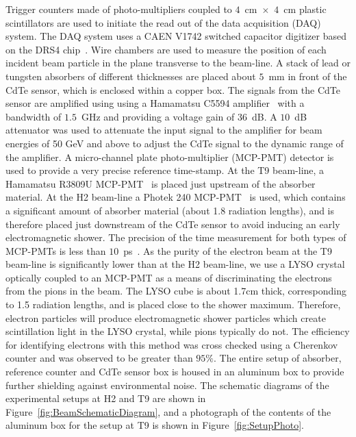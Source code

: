 Trigger counters made of photo-multipliers coupled to $4$~$\mathrm{cm}$~$\times$~$4$~$\mathrm{cm}$ 
plastic scintillators are used 
to initiate the read out of the data acquisition (DAQ) system. The DAQ system
uses a CAEN V1742 switched capacitor digitizer based on the DRS4 chip~\cite{DRS4}. Wire chambers
are used to measure the position of each incident beam particle in the plane transverse
to the beam-line. A stack of lead or tungsten absorbers of different thicknesses are 
placed about $5$~mm in front of the CdTe sensor, which is 
enclosed within a copper box. The signals from the CdTe sensor are amplified using 
using a Hamamatsu C5594 amplifier~\cite{HamaAmpDataSheet} with a bandwidth of
$1.5$~GHz and providing a voltage gain of $36$~dB. A $10$~dB attenuator was used to attenuate the input signal 
to the amplifier for beam energies of 50 GeV and above to adjust the CdTe signal to the dynamic range of the amplifier. 
A micro-channel plate photo-multiplier (MCP-PMT)
detector is used to provide a very precise reference time-stamp. At the T9 beam-line,
a Hamamatsu R3809U MCP-PMT~\cite{HamaMCPDataSheet} is placed just upstream of the absorber material. 
At the H2 beam-line a Photek 240 MCP-PMT~\cite{PhotekDataSheet} is used, which contains a significant 
amount of absorber material (about 1.8 radiation lengths), and is therefore placed 
just downstream of the CdTe sensor to avoid inducing an early electromagnetic shower.
The precision of the time measurement for both types of MCP-PMTs is less than 
$10$~ps~\cite{MCPShowerMaxPaper,Anderson:2015gha}. As the purity of the electron beam at the T9 beam-line is
significantly lower than at the H2 beam-line, we use a LYSO crystal
optically coupled to an MCP-PMT as a means of discriminating the electrons from the pions
in the beam. The LYSO cube is about 1.7cm thick, corresponding to 1.5 radiation lengths, 
and is placed close to the shower maximum. Therefore, electron particles will produce 
electromagnetic shower particles which create scintillation light in the LYSO crystal, 
while pions typically do not. The efficiency for identifying electrons with this method was 
cross checked using a Cherenkov counter and was observed to be greater than $95\%$.
The entire setup of absorber, reference counter and CdTe sensor box is housed in an aluminum
box to provide further shielding against environmental noise.
The schematic diagrams of the experimental setups at H2 and T9 
are shown in Figure~\ref{fig:BeamSchematicDiagram}, and a photograph
of the contents of the aluminum box for the setup at T9 is shown in 
Figure~\ref{fig:SetupPhoto}.


